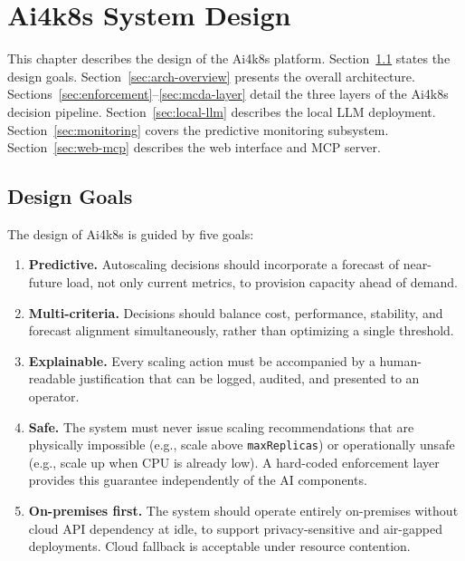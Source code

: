 \chapter{Ai4k8s System Design}
\label{ch:design}

This chapter describes the design of the Ai4k8s platform. Section~\ref{sec:design-goals}
states the design goals. Section~\ref{sec:arch-overview} presents the overall
architecture. Sections~\ref{sec:enforcement}--\ref{sec:mcda-layer} detail the three
layers of the Ai4k8s decision pipeline. Section~\ref{sec:local-llm} describes the
local LLM deployment. Section~\ref{sec:monitoring} covers the predictive monitoring
subsystem. Section~\ref{sec:web-mcp} describes the web interface and MCP server.

\section{Design Goals}
\label{sec:design-goals}

The design of Ai4k8s is guided by five goals:

\begin{enumerate}
  \item \textbf{Predictive.} Autoscaling decisions should incorporate a forecast
  of near-future load, not only current metrics, to provision capacity ahead of
  demand.

  \item \textbf{Multi-criteria.} Decisions should balance cost, performance,
  stability, and forecast alignment simultaneously, rather than optimizing a
  single threshold.

  \item \textbf{Explainable.} Every scaling action must be accompanied by a
  human-readable justification that can be logged, audited, and presented to
  an operator.

  \item \textbf{Safe.} The system must never issue scaling recommendations that
  are physically impossible (e.g., scale above \texttt{maxReplicas}) or
  operationally unsafe (e.g., scale up when CPU is already low). A hard-coded
  enforcement layer provides this guarantee independently of the AI components.

  \item \textbf{On-premises first.} The system should operate entirely
  on-premises without cloud API dependency at idle, to support privacy-sensitive
  and air-gapped deployments. Cloud fallback is acceptable under resource
  contention.
\end{enumerate}

